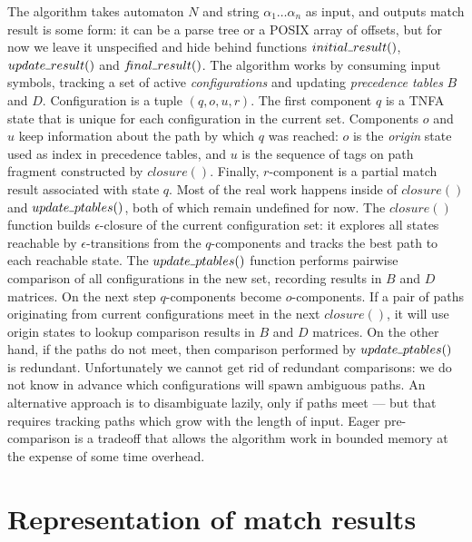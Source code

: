\documentclass[AMA,STIX1COL]{WileyNJD-v2}
\newcommand{\Xund}{\rule{.4em}{.4pt}}
\begin{document}
The algorithm takes automaton $N$ and string $\alpha_1 \!\hdots\! \alpha_n$ as input,
and outputs match result is some form: it can be a parse tree or a POSIX array of offsets,
but for now we leave it unspecified and hide behind functions
$initial \Xund result ()$, $update \Xund result ()$ and $f\!inal \Xund result ()$.
The algorithm works by consuming input symbols,
tracking a set of active \emph{configurations}
and updating \emph{precedence tables} $B$ and $D$.
Configuration is a tuple $(q, o, u, r)$.
The first component $q$ is a TNFA state that is unique for each configuration in the current set.
Components $o$ and $u$ keep information about the path by which $q$ was reached:
$o$ is the \emph{origin} state used as index in precedence tables,
and $u$ is the sequence of tags on path fragment constructed by $closure()$.
Finally, $r$-component is a partial match result associated with state $q$.
Most of the real work happens inside of $closure()$ and $update \Xund ptables ()$, both of which remain undefined for now.
The $closure()$ function builds $\epsilon$-closure of the current configuration set:
it explores all states reachable by $\epsilon$-transitions from the $q$-components
and tracks the best path to each reachable state.
The $update \Xund ptables ()$ function
performs pairwise comparison of all configurations in the new set,
recording results in $B$ and $D$ matrices.
On the next step $q$-components become $o$-components.
If a pair of paths originating from current configurations meet in the next $closure ()$,
it will use origin states to lookup comparison results in $B$ and $D$ matrices.
On the other hand, if the paths do not meet, then comparison performed by $update \Xund ptables ()$ is redundant.
Unfortunately we cannot get rid of redundant comparisons:
we do not know in advance which configurations will spawn ambiguous paths.
An alternative approach is to disambiguate lazily, only if paths meet ---
but that requires tracking paths which grow with the length of input.
Eager pre-comparison is a tradeoff that
allows the algorithm work in bounded memory at the expense of some time overhead.
\\


\section{Representation of match results}
\end{document}
